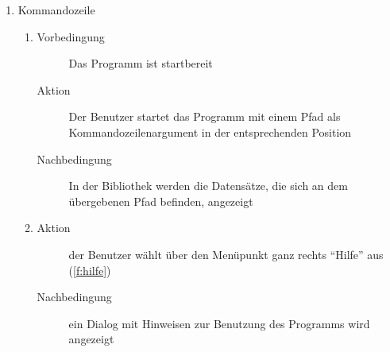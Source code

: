 \begin{enumerate} [label=\bfseries /TS \arabic*0/, leftmargin=*]
\begin{enumerate}[leftmargin=0pt, itemindent=0pt]
\begin{description}
		\end{description}
		\item
		\begin{description}
			\item[Aktion] Der Benutzer startet die Suche erneut
			\item[Nachbedingung] Eine Animation zeigt die Aktivität des  an (\ref{f:fortschrittsanimation})
		\end{description}
		\item
		\begin{description}
			\item[Aktion] Der Benutzer beendet das Programm (während der laufenden Suche) über den üblichen Schließen-Button (\ref{f:beenden})
			\item[Nachbedingung] die \gls{GUI} ist nicht mehr sichtbar; der Prozess hat terminiert
		\end{description}
	\end{enumerate}

	\item Kommandozeile \label{ts:standardordner_übergeben}
	\begin{enumerate}[leftmargin=0pt]
		\item
		\begin{description}
			\item[Vorbedingung] Das Programm ist startbereit
			\item[Aktion] Der Benutzer startet das Programm mit einem Pfad als Kommandozeilenargument in der entsprechenden Position
			\item[Nachbedingung] In der Bibliothek werden die Datensätze, die sich an dem übergebenen Pfad befinden, angezeigt
		\end{description}
		\item
		\begin{description}
			\item[Aktion] der Benutzer wählt über den Menüpunkt ganz rechts \enquote{Hilfe} aus (\ref{f:hilfe})
			\item[Nachbedingung] ein \gls{Dialog} mit Hinweisen zur Benutzung des Programms wird angezeigt
		\end{description}
	\end{enumerate}


\end{enumerate}
